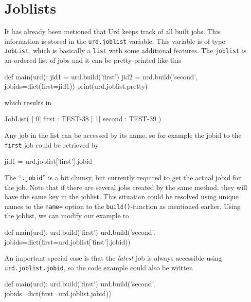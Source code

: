 \section{Joblists}
It has already been metioned that Urd keeps track of all built jobs.
This information is stored in the \texttt{urd.joblist} variable.  This
variable is of type \texttt{JobList}, which is basically
a \texttt{list} with some additional features.  The \texttt{joblist}
is an ordered list of jobs and it can be pretty-printed like this
\begin{python}
def main(urd):
    jid1 = urd.build('first')
    jid2 = urd.build('second', jobids=dict(first=jid1))
    print(urd.joblist.pretty)
\end{python}
which results in
\begin{shell}
JobList(
   [  0]  first : TEST-38
   [  1] second : TEST-39
)
\end{shell}
Any job in the list can be accessed by its name, so for example the
jobid to the \texttt{first} job could be retrieved by
\begin{python}
  jid1 = urd.joblist['first'].jobid
\end{python}
The ``\texttt{.jobid}'' is a bit clumsy, but currently required to get
the actual jobid for the job.  Note that if there are several jobs
created by the same method, they will have the same key in the
joblist.  This situation could be resolved using unique names to
the \texttt{name=} option to the \texttt{build()}-function as
mentioned earlier.  Using the joblist, we can modify our example to
\begin{python}
def main(urd):
    urd.build('first')
    urd.build('second', jobids=dict(first=urd.joblist['first'].jobid))
\end{python}
An important special case is that the \textsl{latest} job is always
accessible using \texttt{urd.joblist.jobid}, so the code example could also be written
\begin{python}
def main(urd):
    urd.build('first')
    urd.build('second', jobids=dict(first=urd.joblist.jobid))
\end{python}
